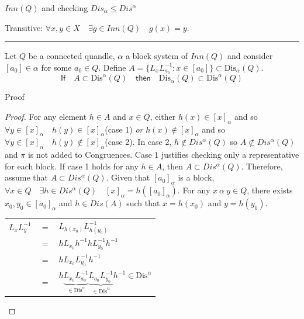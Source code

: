 \begin{frame}{$Inn(Q)$ and checking $Dis_\alpha \leq Dis^\alpha$}

Transitive: $\forall x,y \in X\quad \exists g \in Inn(Q)\quad g(x)=y$.
\par\noindent\rule{0.7\textwidth}{0.4pt}
\begin{lemma}
Let $Q$ be a connected quandle, $\alpha$ a block system of $Inn(Q)$ and consider $[a_0]\in \alpha$ for some $a_0\in Q$. Define $A = \{ L_xL_{a_0}^{-1} : x \in [a_0]\} \subset \text{Dis}_\alpha(Q)$.
\[\textsf{If} \quad A \subset \text{Dis}^\alpha(Q) \quad \textsf{then} \quad \text{Dis}_\alpha(Q) \subset \text{Dis}^\alpha(Q)\]
\end{lemma}

\end{frame} 
\begin{frame}{Proof}
\small
\begin{proof}

For any element $h\in A$ and $x\in Q$, either $h(x)\in [x]_\alpha$ and so $\forall y \in [x]_\alpha\quad h(y)\in[x]_\alpha$(case 1) \emph{or} $h(x)\notin [x]_\alpha$ and so $\forall y \in [x]_\alpha \quad h(y)\notin [x]_\alpha$(case 2). In case 2, $h \notin Dis^\alpha(Q)$ so $A \not\subset Dis^\alpha(Q)$ and $\pi$ is not added to \textsf{Congruences}. Case 1 justifies checking only a representative for each block. If case 1 holds for any $h \in A$, then $A \subset Dis^\alpha(Q)$.\newline
Therefore, assume that $A \subset Dis^\alpha(Q)$.\newline
Given that $[a_0]_\alpha$ is a block, $\forall x \in Q\quad \exists h\in Dis^\alpha(Q)\quad [x]_\alpha = h([a_0]_\alpha)$.\newline
For any $x~\alpha~y\in Q$, there exists $x_0,y_0\in [a_0]_\alpha$ and $h\in Dis(A)$ such that $x=h(x_0)$ and $y=h(y_0)$.
\begin{center}
    \begin{tabular}{ccl}
        $L_xL_y^{-1}$ & $=$ & $L_{h(x_0)}L_{h(y_0)}^{-1}$\\
         & $=$ & $hL_{x_0}h^{-1}hL_{y_0}^{-1}h^{-1}$\\
         & $=$ & $hL_{x_0}L_{y_0}^{-1}h^{-1}$\\
         & $=$ & $h\underbrace{L_{x_0}L_{a_0}^{-1}}_{\in \text{Dis}^\alpha}\underbrace{L_{a_0}L_{y_0}^{-1}}_{ \in \text{Dis}^\alpha}h^{-1} \in \text{Dis}^\alpha$\\
    \end{tabular}
\end{center}


\end{proof}
\end{frame}
